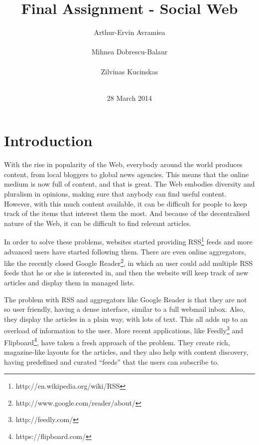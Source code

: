 \documentclass{acm_proc_10ptArticle-sp}
\begin{document}
\title{Final Assignment - Social Web}

\author{
%
\alignauthor Arthur-Ervin Avramiea\\
       \\
\alignauthor Mihnea Dobrescu-Balaur\\
	\\
\alignauthor Zilvinas Kucinskas\\
	\\
}

\date{28 March 2014}
\maketitle

\section{Introduction}

With the rise in popularity of the Web, everybody around the world produces content, from local bloggers to global news agencies. This means that the online medium is now full of content, and that is great. The Web embodies diversity and pluralism in opinions, making sure that anybody can find useful content. However, with this much content available, it can be difficult for people to keep track of the items that interest them the most. And because of the decentralised nature of the Web, it can be difficult to find relevant articles.

In order to solve these problems, websites started providing RSS\footnote{http://en.wikipedia.org/wiki/RSS} feeds and more advanced users have started following them. There are even online aggregators, like the recently closed Google Reader\footnote{http://www.google.com/reader/about/}, in which an user could add multiple RSS feeds that he or she is interested in, and then the website will keep track of new articles and display them in managed lists.

The problem with RSS and aggregators like Google Reader is that they are not so user friendly, having a dense interface, similar to a full webmail inbox. Also, they display the articles in a plain way, with lots of text. This all adds up to an overload of information to the user. More recent applications, like Feedly\footnote{http://feedly.com/} and Flipboard\footnote{https://flipboard.com/}, have taken a fresh approach of the problem. They create rich, magazine-like layouts for the articles, and they also help with content discovery, having predefined and curated “feeds” that the users can subscribe to.
\end{document}
